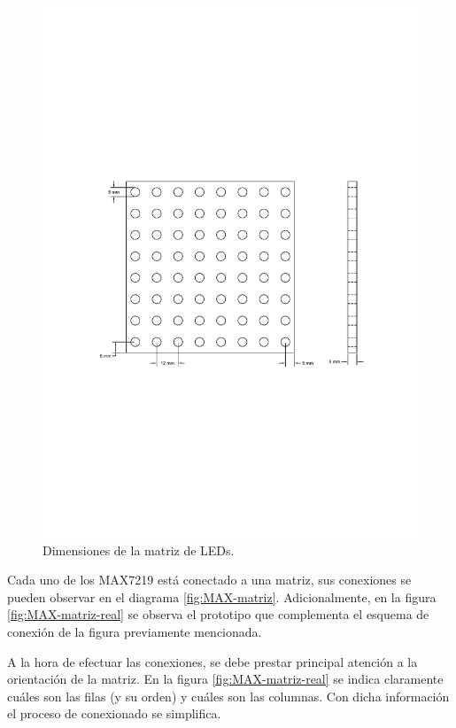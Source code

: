 \begin{figure}[ht!]
	\centering
	\includegraphics[width=0.8\linewidth]{imagenes/hw/modulo-led-dimensiones.pdf}
	\caption{Dimensiones de la matriz de LEDs.}
	\label{fig:modulo-led-dimensiones}
\end{figure}

Cada uno de los MAX7219 está conectado a una matriz, sus conexiones se pueden observar en el diagrama \ref{fig:MAX-matriz}. Adicionalmente, en la figura \ref{fig:MAX-matriz-real} se observa el prototipo que complementa el esquema de conexión de la figura previamente mencionada.

A la hora de efectuar las conexiones, se debe prestar principal atención a la orientación de la matriz. En la figura \ref{fig:MAX-matriz-real} se indica claramente cuáles son las filas (y su orden) y cuáles son las columnas. Con dicha información el proceso de conexionado se simplifica.

